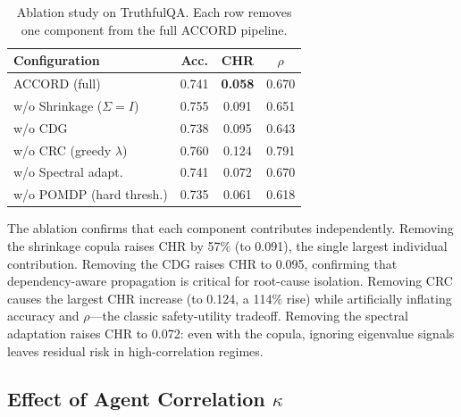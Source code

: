 \documentclass[conference]{IEEEtran}
\begin{document}
\begin{table}[htbp]
\caption{%
  Ablation study on TruthfulQA.
  Each row removes one component from the full ACCORD pipeline.
}
\label{tab:ablation}
\centering
\begin{tabular}{lccc}
\toprule
Configuration & Acc. & CHR & $\rho$ \\
\midrule
ACCORD (full)             & 0.741 & \textbf{0.058} & 0.670 \\
w/o Shrinkage ($\Sigma=I$)& 0.755 & 0.091          & 0.651 \\
w/o CDG                   & 0.738 & 0.095          & 0.643 \\
w/o CRC (greedy $\lambda$)& 0.760 & 0.124          & 0.791 \\
w/o Spectral adapt.       & 0.741 & 0.072          & 0.670 \\
w/o POMDP (hard thresh.)  & 0.735 & 0.061          & 0.618 \\
\bottomrule
\end{tabular}
\end{table}

The ablation confirms that each component contributes
independently.
Removing the shrinkage copula raises CHR by 57\% (to 0.091),
the single largest individual contribution.
Removing the CDG raises CHR to 0.095, confirming that
dependency-aware propagation is critical for root-cause
isolation.
Removing CRC causes the largest CHR increase (to 0.124, a 114\%
rise) while artificially inflating accuracy and $\rho$—the
classic safety-utility tradeoff.
Removing the spectral adaptation raises CHR to 0.072:
even with the copula, ignoring eigenvalue signals leaves
residual risk in high-correlation regimes.

\subsection{Effect of Agent Correlation $\kappa$}
\end{document}
